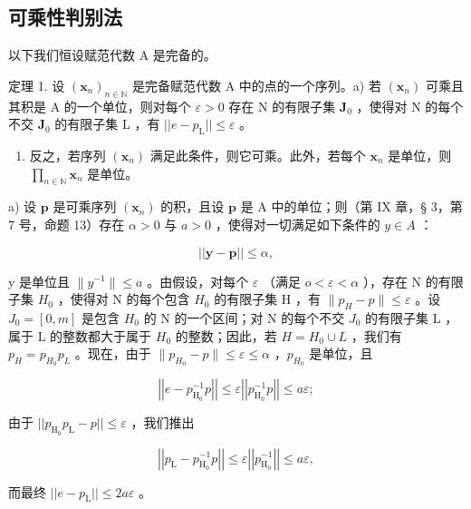 \subsection{可乘性判别法}

以下我们恒设赋范代数 A 是完备的。

定理 1. 设 \((\pmb{x}_n)_{n\in \mathbb{N}}\) 是完备赋范代数 A 中的点的一个序列。a) 若 \((\pmb{x}_n)\) 可乘且其积是 A 的一个单位，则对每个 \(\varepsilon >0\) 存在 N 的有限子集 \(\mathbf{J}_0\) ，使得对 N 的每个不交 \(\mathbf{J}_0\) 的有限子集 L ，有 \(||e - p_{\mathrm{L}}||\leqslant \varepsilon\) 。

\begin{enumerate}
\def\labelenumi{\alph{enumi})}
\setcounter{enumi}{1}
\item
  反之，若序列 \((\pmb{x}_n)\) 满足此条件，则它可乘。此外，若每个 \(\pmb{x}_n\) 是单位，则 \(\prod_{n\in \mathbb{N}}\pmb{x}_n\) 是单位。
\end{enumerate}

a) 设 \(\pmb{p}\) 是可乘序列 \((\pmb{x}_n)\) 的积，且设 \(\pmb{p}\) 是 A 中的单位；则（第 IX 章，§ 3，第 7 号，命题 13）存在 \(\alpha > 0\) 与 \(a > 0\) ，使得对一切满足如下条件的 \(y \in A\) ：

\[
\left| \left| \boldsymbol {y} - \boldsymbol {p} \right| \right| \leqslant \alpha ,
\]

y 是单位且 \(\|y^{-1}\|\leqslant a\) 。由假设，对每个 \(\varepsilon\) （满足 \(o<\varepsilon<\alpha\) ），存在 N 的有限子集 \(H_{0}\) ，使得对 N 的每个包含 \(H_{0}\) 的有限子集 H ，有 \(\|p_{H}-p\|\leqslant\varepsilon\) 。设 \(J_{0}=[0,m]\) 是包含 \(H_{0}\) 的 N 的一个区间；对 N 的每个不交 \(J_{0}\) 的有限子集 L ，属于 L 的整数都大于属于 \(H_{0}\) 的整数；因此，若 \(H=H_{0}\cup L\) ，我们有 \(p_{H}=p_{H_{0}}p_{L}\) 。现在，由于 \(\|p_{H_{0}}-p\|\leqslant\varepsilon\leqslant\alpha\) ，\(p_{H_{0}}\) 是单位，且

\[
\left| \left| e - p _ {\mathrm{H} _ {0}} ^ {- 1} p \right| \right| \leqslant \varepsilon \left| \left| p _ {\mathrm{H} _ {0}} ^ {- 1} p \right| \right| \leqslant a \varepsilon ;
\]

由于 \(||p_{\mathrm{H_0}}p_{\mathrm{L}} - p|| \leqslant \varepsilon\) ，我们推出

\[
\left| \left| p _ {\mathrm{L}} - p _ {\mathrm{H} _ {0}} ^ {- 1} p \right| \right| \leqslant \varepsilon \left| \left| p _ {\mathrm{H} _ {0}} ^ {- 1} \right| \right| \leqslant a \varepsilon ,
\]

而最终 \(||e - p_{\mathrm{L}}|| \leqslant 2a\varepsilon\) 。

